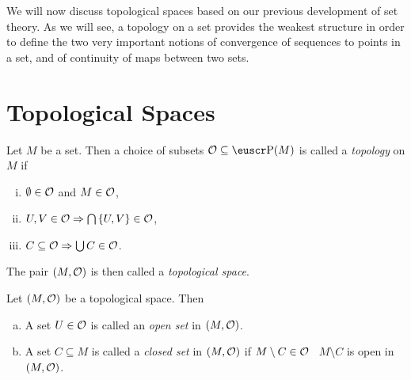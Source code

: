 
We will now discuss topological spaces based on our previous development of set theory. As we will see, a topology on a set provides the weakest structure in order to define the two very important notions of convergence of sequences to points in a set, and of continuity of maps between two sets.

\section{Topological Spaces}

\begin{definition}
	Let \(M\) be a set. Then a choice of subsets \(\O \subseteq \powerset(M)\) is called a \emph{topology} on \(M\) if
	\begin{enumerate}[(i)]
		\item \(\emptyset \in \mathcal{O}\) and \(M \in \mathcal{O}\),
		\item \(U, V \in \mathcal{O} \Rightarrow \bigcap \qty{U, V} \in \mathcal{O}\),
		\item \(C \subseteq \mathcal{O} \Rightarrow \bigcup C \in \mathcal{O}\).
	\end{enumerate}
	The pair \((M, \mathcal{O})\) is then called a \emph{topological space}.
\end{definition}
\begin{remark}
	Let \((M, \mathcal{O})\) be a topological space. Then
	\begin{enumerate}[(a)]
		\item A set \(U \in \mathcal{O}\) is called an \emph{open set} in \((M, \mathcal{O})\).
		\item A set \(C \subseteq M\) is called a \emph{closed set} in \((M, \mathcal{O})\) if \(M \setminus C \in \mathcal{O}\) \ie\ \(M \setminus C\) is open in \((M, \mathcal{O})\).
	\end{enumerate}
\end{remark}


